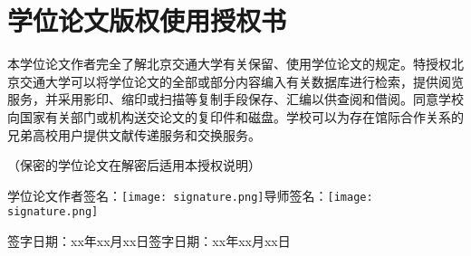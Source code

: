 \chapter*{学位论文版权使用授权书}
\thispagestyle{empty}


本学位论文作者完全了解北京交通大学有关保留、使用学位论文的规定。特授权北京交通大学可以将学位论文的全部或部分内容编入有关数据库进行检索，提供阅览服务，并采用影印、缩印或扫描等复制手段保存、汇编以供查阅和借阅。同意学校向国家有关部门或机构送交论文的复印件和磁盘。学校可以为存在馆际合作关系的兄弟高校用户提供文献传递服务和交换服务。

（保密的学位论文在解密后适用本授权说明）


\vspace{72pt}
学位论文作者签名：\hspace{0.2em}\texttt{[image: signature.png]}\hspace{2em}导师签名：\hspace{0.1em}\texttt{[image: signature.png]}


\vspace{12pt}
签字日期：xx年xx月xx日\hspace{7em}签字日期：xx年xx月xx日




